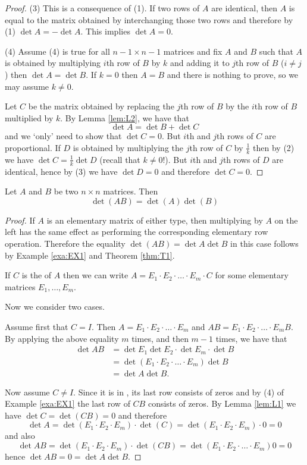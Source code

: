 \begin{proof}
(3) This is a consequence of (1). If two rows of $A$ are identical, then 
$A$ is equal to the matrix obtained by interchanging those two rows and 
therefore by (1) $\det A=-\det A$. This implies $\det A=0$. 

(4) Assume (4) is true for all $n-1\times n-1$ matrices
and fix $A$ and $B$ such that
 $A$ is obtained by multiplying $i$th row of $B$ by $k$ and adding it to 
$j$th row of $B$ ($i\neq j$) then $\det A=\det B$. 
If $k=0$ then $A=B$ and there is nothing to prove, so we may assume $k\neq 0$. 

Let $C$ be the matrix obtained by replacing the $j$th row of $B$ by the $i$th row of $B$ 
multiplied by $k$. 
By Lemma \ref{lem:L2}, we have that 
\[
\det A=\det B+\det C
\]
and we `only' need to show that $\det C=0$. But $i$th and $j$th rows of $C$
are proportional. If $D$ is obtained by multiplying the $j$th row of $C$ by $\frac 1k$
then  by (2) we have $\det C=\frac 1k\det D$ (recall that $k\neq 0$!). 
But $i$th and $j$th rows of $D$ are identical, hence by (3) we have $\det D=0$
and therefore $\det C=0$. 
\end{proof} 

\begin{theorem}{}\label{thm:T2}
Let $A$ and $B$ be two $n\times n$ matrices. Then 
\begin{equation*}
\det \left( AB\right) =\det \left( A\right) \det \left( B\right)
\end{equation*}
\end{theorem}

\begin{proof} If $A$ is an elementary matrix of either type, then multiplying
by $A$ on the left has the same effect as performing the corresponding elementary 
row operation. Therefore the equality $\det (AB) =\det A\det B$  in this case follows by Example \ref{exa:EX1} 
and Theorem \ref{thm:T1}. 

If $C$ is the \rref\;of $A$ then we can write $A=E_1\cdot E_2\cdot\dots\cdot E_m\cdot C$
for some elementary matrices $E_1,\dots, E_m$. 

Now we consider two cases. 

Assume first that  $C=I$. Then $A=E_1\cdot E_2\cdot \dots\cdot E_m$ 
and $AB= E_1\cdot E_2\cdot \dots\cdot E_m B$. 
    By applying the above equality $m$ times, and then $m-1$ times,   
we have that 
\begin{align*}
\det AB&=\det E_1\det E_2\cdot \det E_m\cdot \det B\\
&=\det (E_1\cdot E_2\cdot\dots\cdot E_m) \det B\\
&=\det A\det B. 
\end{align*} 

Now assume $C\neq I$. Since it is in \rref, its last row consists of zeros 
and by (4) of Example \ref{exa:EX1} the last row of $CB$ consists of zeros. 
By Lemma \ref{lem:L1} we have $\det C=\det (CB)=0$ and therefore 
\[
\det A=\det (E_1\cdot E_2\cdot  E_m)\cdot  \det (C)
=
\det (E_1\cdot E_2\cdot  E_m)\cdot 0=0
\]
and also 
\[
\det AB=\det (E_1\cdot E_2\cdot  E_m)\cdot  \det (C B)
=\det (E_1\cdot E_2\cdot\dots\cdot E_m) 0
=0
\]
hence $\det AB=0=\det A \det B$. 
\end{proof} 

